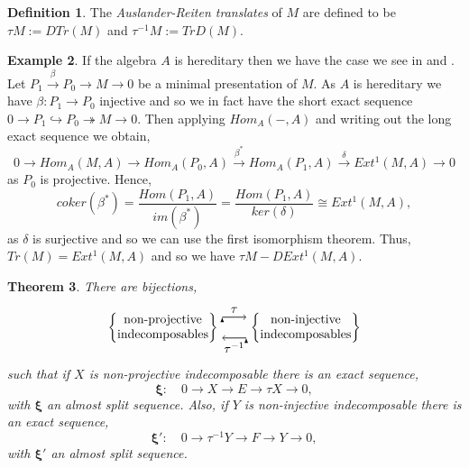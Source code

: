 \documentclass[11.5pt, twoside, a4paper, titlepage]{report}
\makeatletter
\theoremstyle{definition}
\newtheorem{mydef}{Definition}[section]
\newtheorem{eg}[mydef]{Example}
\theoremstyle{plain}
\newtheorem{thm}[mydef]{Theorem}
\newcommand{\mytab}[1]{%
\begin{tabular}{@{}c@{}}
#1
\end{tabular}
}
\makeatother
\begin{document}
\begin{mydef}
The \emph{Auslander-Reiten translates} of $M$ are defined to be $\tau M:=DTr(M)$ and $\tau^{-1}M :=TrD(M)$.
\end{mydef}

\begin{eg}
If the algebra $A$ is hereditary then we have the case we see in \cite{CB2} and \cite{CB3}. Let $P_1 \xrightarrow{\beta} P_0 \to M \to 0$ be a minimal presentation of $M$. As $A$ is hereditary we have $\beta: P_1 \to P_0$ injective and so we in fact have the short exact sequence $0 \to P_1 \hookrightarrow P_0 \twoheadrightarrow M \to 0$. Then applying $Hom_A(-,A)$ and writing out the long exact sequence we obtain, 
\begin{equation*}
0 \xrightarrow{} Hom_A(M,A) \xrightarrow{} Hom_A(P_0, A) \xrightarrow{\beta^{\ast}} Hom_A(P_1, A) \xrightarrow{\delta} Ext^1(M, A) \xrightarrow{} 0
\end{equation*}
as $P_0$ is projective. Hence,
\begin{equation*}
coker(\beta^{\ast})=\frac{Hom(P_1,A)}{im(\beta^{\ast})}=\frac{Hom(P_1, A)}{ker(\delta)}\cong Ext^1(M,A),
\end{equation*}
as $\delta$ is surjective and so we can use the first isomorphism theorem. Thus, $Tr(M)=Ext^1(M,A)$ and so we have $\tau M -DExt^1(M,A)$.
\end{eg}

\begin{thm} \label{taubijectionthm}
There are bijections,
 \begin{equation*}
\begin{tikzpicture}[->,-latex, auto, main path/.style={->, semithick}, main node/.style={}]
\node	[main node]		(2) at (0,0)		{$\left\{\mytab{\text{non-projective}\\ \text{indecomposables}}\right\}$};
\node	[main node]		(3) at (4,0)		{$\left\{\mytab{\text{non-injective}\\ \text{indecomposables}}\right\}$};

\draw (2.10) edge [main path] node [auto] {$\tau$} (3.170);
\draw (3.190) edge [main path] node [auto] {$\tau^{-1}$} (2.350);
\end{tikzpicture}
\end{equation*}
such that if $X$ is non-projective indecomposable there is an exact sequence,
\begin{equation*}
\mathbf{\xi}:  \quad 0 \xrightarrow{} X \xrightarrow{} E \xrightarrow{} \tau X \xrightarrow{} 0,
\end{equation*}
with $\mathbf{\xi}$ an almost split sequence. Also, if $Y$ is non-injective indecomposable there is an exact sequence, 
\begin{equation*}
\mathbf{\xi'}: \quad 0 \xrightarrow{} \tau^{-1}Y \xrightarrow{} F \xrightarrow{} Y \xrightarrow{} 0,
\end{equation*}
with $\mathbf{\xi'}$ an almost split sequence.
\end{thm}
\end{document}
